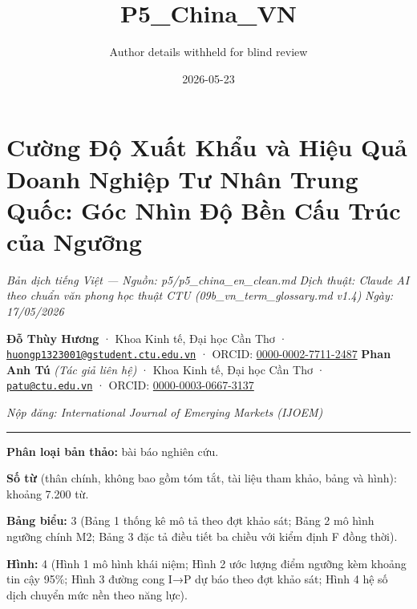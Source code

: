 \documentclass[12pt,a4paper]{article}
\title{P5\_China\_VN}
\author{Author details withheld for blind review}
\date{2026-05-23}
\begin{document}
\maketitle

\hypertarget{cux1b0ux1eddng-ux111ux1ed9-xuux1ea5t-khux1ea9u-vuxe0-hiux1ec7u-quux1ea3-doanh-nghiux1ec7p-tux1b0-nhuxe2n-trung-quux1ed1c-guxf3c-nhuxecn-ux111ux1ed9-bux1ec1n-cux1ea5u-truxfac-cux1ee7a-ngux1b0ux1ee1ng}{%
\section{Cường Độ Xuất Khẩu và Hiệu Quả Doanh Nghiệp Tư Nhân Trung Quốc:
Góc Nhìn Độ Bền Cấu Trúc của
Ngưỡng}\label{cux1b0ux1eddng-ux111ux1ed9-xuux1ea5t-khux1ea9u-vuxe0-hiux1ec7u-quux1ea3-doanh-nghiux1ec7p-tux1b0-nhuxe2n-trung-quux1ed1c-guxf3c-nhuxecn-ux111ux1ed9-bux1ec1n-cux1ea5u-truxfac-cux1ee7a-ngux1b0ux1ee1ng}}

\emph{Bản dịch tiếng Việt --- Nguồn: p5/p5\_china\_en\_clean.md}
\emph{Dịch thuật: Claude AI theo chuẩn văn phong học thuật CTU
(09b\_vn\_term\_glossary.md v1.4)} \emph{Ngày: 17/05/2026}

\textbf{Đỗ Thùy Hương} · Khoa Kinh tế, Đại học Cần Thơ ·
\href{mailto:huongp1323001@gstudent.ctu.edu.vn}{\nolinkurl{huongp1323001@gstudent.ctu.edu.vn}}
· ORCID:
\href{https://orcid.org/0000-0002-7711-2487}{0000-0002-7711-2487}
\textbf{Phan Anh Tú} \emph{(Tác giả liên hệ)} · Khoa Kinh tế, Đại học
Cần Thơ · \href{mailto:patu@ctu.edu.vn}{\nolinkurl{patu@ctu.edu.vn}} ·
ORCID: \href{https://orcid.org/0000-0003-0667-3137}{0000-0003-0667-3137}

\emph{Nộp đăng: International Journal of Emerging Markets (IJOEM)}

\begin{center}\rule{0.5\linewidth}{0.5pt}\end{center}

\textbf{Phân loại bản thảo:} bài báo nghiên cứu.

\textbf{Số từ} (thân chính, không bao gồm tóm tắt, tài liệu tham khảo,
bảng và hình): khoảng 7.200 từ.

\textbf{Bảng biểu:} 3 (Bảng 1 thống kê mô tả theo đợt khảo sát; Bảng 2
mô hình ngưỡng chính M2; Bảng 3 đặc tả điều tiết ba chiều với kiểm định
F đồng thời).

\textbf{Hình:} 4 (Hình 1 mô hình khái niệm; Hình 2 ước lượng điểm ngưỡng
kèm khoảng tin cậy 95\%; Hình 3 đường cong I→P dự báo theo đợt khảo sát;
Hình 4 hệ số dịch chuyển mức nền theo năng lực).
\end{document}

